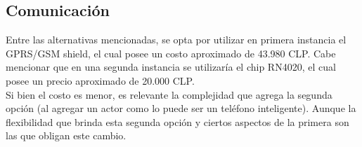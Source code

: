 \subsection{Comunicación}
Entre las alternativas mencionadas, se opta por utilizar en primera instancia el GPRS/GSM shield, el cual posee un costo aproximado de 43.980 CLP.
Cabe mencionar que en una segunda instancia se utilizaría el chip RN4020, el cual posee un precio aproximado de 20.000 CLP.\\
Si bien el costo es menor, es relevante la complejidad que agrega la segunda opción (al agregar un actor como lo puede ser un teléfono inteligente). Aunque la flexibilidad que brinda esta segunda opción y ciertos aspectos de la primera son las que obligan este cambio.